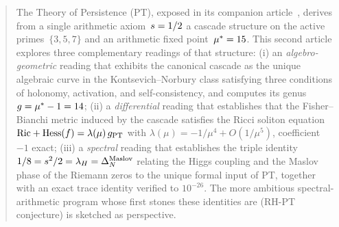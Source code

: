 



\maketitle

\begin{abstract}
\noindent
The Theory of Persistence (PT), exposed in its companion article~\cite{PT_Article1_Foundations}, derives from a single arithmetic axiom~$\sper = 1/2$ a cascade structure on the active primes~$\{3, 5, 7\}$ and an arithmetic fixed point~$\mustar = 15$. This second article explores three complementary readings of that structure: (i) an \emph{algebro-geometric} reading that exhibits the canonical cascade as the unique algebraic curve in the Kontsevich--Norbury class satisfying three conditions of holonomy, activation, and self-consistency, and computes its genus $\genus = \mustar - 1 = 14$; (ii) a \emph{differential} reading that establishes that the Fisher--Bianchi metric induced by the cascade satisfies the Ricci soliton equation $\Ric + \Hess(f) = \lambda(\mu)\, \gPT$ with $\lambda(\mu) = -1/\mu^{4} + O(1/\mu^{5})$, coefficient~$-1$ exact; (iii) a \emph{spectral} reading that establishes the triple identity $1/8 = \sper^{2}/2 = \lambdaH = \DeltaMaslov$ relating the Higgs coupling and the Maslov phase of the Riemann zeros to the unique formal input of PT, together with an exact trace identity verified to $10^{-26}$. The more ambitious spectral-arithmetic program whose first stones these identities are (RH-PT conjecture) is sketched as perspective.
\end{abstract}

\tableofcontents








\appendix



\printbibliography



